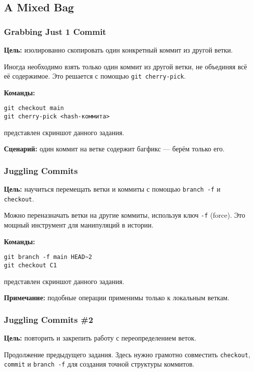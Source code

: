 \documentclass[a4paper,12pt]{report}
\begin{document}
\subsection{A Mixed Bag}

\subsubsection{Grabbing Just 1 Commit}
\textbf{Цель:} изолированно скопировать один конкретный коммит из другой ветки.

Иногда необходимо взять только один коммит из другой ветки, не объединяя всё её содержимое. Это решается с помощью \texttt{git cherry-pick}.

\textbf{Команды:}
\begin{verbatim}
git checkout main
git cherry-pick <hash-коммита>
\end{verbatim}

 представлен скриншот данного задания.

\textbf{Сценарий:} один коммит на ветке содержит багфикс — берём только его.

\subsubsection{Juggling Commits}
\textbf{Цель:} научиться перемещать ветки и коммиты с помощью \texttt{branch -f} и \texttt{checkout}.

Можно переназначать ветки на другие коммиты, используя ключ \texttt{-f} (force). Это мощный инструмент для манипуляций в истории.

\textbf{Команды:}
\begin{verbatim}
git branch -f main HEAD~2
git checkout C1
\end{verbatim}

 представлен скриншот данного задания.

\textbf{Примечание:} подобные операции применимы только к локальным веткам.

\subsubsection{Juggling Commits \#2}
\textbf{Цель:} повторить и закрепить работу с переопределением веток.

Продолжение предыдущего задания. Здесь нужно грамотно совместить \texttt{checkout}, \texttt{commit} и \texttt{branch -f} для создания точной структуры коммитов.
\end{document}
